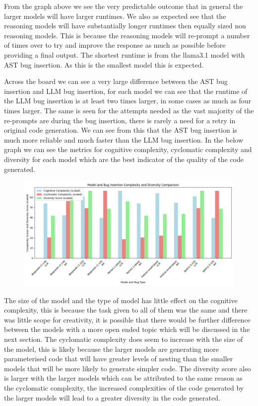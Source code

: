 \documentclass[12pt]{extarticle}
\begin{document}
From the graph above we see the very predictable outcome that in general the larger models will have larger runtimes. We also as expected see that the reasoning models will have substantially longer runtimes then equally sized non reasoning models. This is because the reasoning models will re-prompt a number of times over to try and improve the response as much as possible before providing a final output. The shortest runtime is from the llama3.1 model with AST bug insertion. As this is the smallest model this is expected. 

Across the board we can see a very large difference between the AST bug insertion and LLM bug insertion, for each model we can see that the runtime of the LLM bug insertion is at least two times larger, in some cases as much as four times larger. The same is seen for the attempts needed as the vast majority of the re-prompts are during the bug insertion, there is rarely a need for a retry in original code generation. We can see from this that the AST bug insertion is much more reliable and much faster than the LLM bug insertion. In the below graph we can see the metrics for cognitive complexity, cyclomatic complexity and diversity for each model which are the best indicator of the quality of the code generated.

\begin{figure}[h!]
\centering
\includegraphics[width=\linewidth]{Images/Complexity_Comparison_Fibbonaci.png}
\label{fig:Complexity_Benchmark}
\end{figure}

The size of the model and the type of model has little effect on the cognitive complexity, this is because the task given to all of them was the same and there was little scope for creativity, it is possible that there would be further difference between the models with a more open ended topic which will be discussed in the next section. The cyclomatic complexity does seem to increase with the size of the model, this is likely because the larger models are generating more parameterised code that will have greater levels of nesting than the smaller models that will be more likely to generate simpler code. The diversity score also is larger with the larger models which can be attributed to the same reason as the cyclomatic complexity, the increased complexities of the code generated by the larger models will lead to a greater diversity in the code generated.
\end{document}
